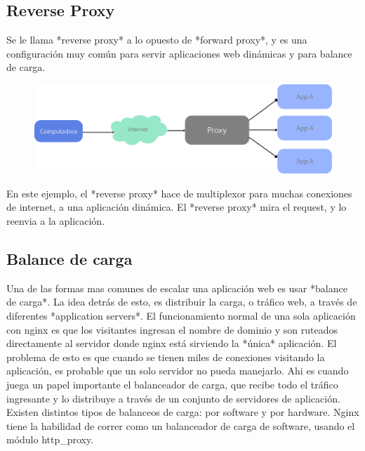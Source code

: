 \subsection[Reverse Proxy]{Reverse Proxy}

Se le llama *reverse proxy* a lo opuesto de *forward proxy*, y es una configuración muy común para servir aplicaciones web dinámicas y para balance de carga.

\begin{figure}[h!]
  \centering
    \includegraphics[scale=0.7]{images/reverse-proxy.png}
  \label{fig:reverseproxy}
\end{figure}

En este ejemplo, el *reverse proxy* hace de multiplexor para muchas conexiones de internet, a una aplicación dinámica. El *reverse proxy* mira el request, y lo reenvia a la aplicación.

\subsection[Balance de carga]{Balance de carga}

Una de las formas mas comunes de escalar una aplicación web es usar *balance de carga*. La idea detrás de esto, es distribuir la carga, o tráfico web, a través de diferentes *application servers*.
El funcionamiento normal de una sola aplicación con nginx es que los visitantes ingresan el nombre de dominio y son ruteados directamente al servidor donde nginx está sirviendo la *única* aplicación. El problema de esto es que cuando se tienen miles de conexiones visitando la aplicación, es probable que un solo servidor no pueda manejarlo. 
Ahi es cuando juega un papel importante el balanceador de carga, que recibe todo el tráfico ingresante y lo distribuye a través de un conjunto de servidores de aplicación.
Existen distintos tipos de balanceos de carga: por software y por hardware. Nginx tiene la habilidad de correr como un balanceador de carga de software, usando el módulo http_proxy.

